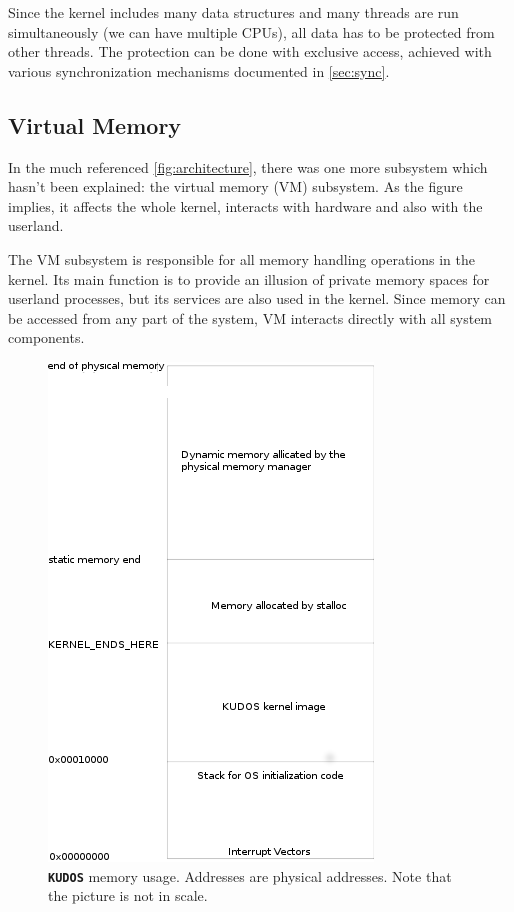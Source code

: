 \documentclass[twoside,a4paper]{report}
\newlength{\tablewidth}
\newcommand{\kudos}{\texttt{\textbf{KUDOS}}}
\begin{document}
Since the kernel includes many data structures and many threads are
run simultaneously (we can have multiple CPUs), all data has to be
protected from other threads. The protection can be done with
exclusive access, achieved with various synchronization mechanisms
documented in \autoref{sec:sync}.

\subsection{Virtual Memory}

In the much referenced \autoref{fig:architecture}, there was one
more subsystem which hasn't been explained: the virtual memory (VM)
subsystem. As the figure implies, it affects the whole kernel,
interacts with hardware and also with the userland.

The VM subsystem is responsible for all memory handling operations in
the kernel. Its main function is to provide an illusion of private
memory spaces for userland processes, but its services are also used
in the kernel. Since memory can be accessed from any part of the
system, VM interacts directly with all system components.

\begin{figure}
\begin{center}
\includegraphics[width=\tablewidth,angle=0]{pics/kudos_memory.png}
\caption{\kudos{} memory usage. Addresses are physical addresses.
Note that the picture is not in scale.}
\label{fig:buenosmemory}
\end{center}
\end{figure}
\end{document}

